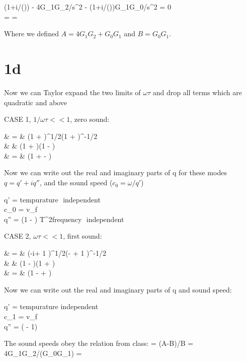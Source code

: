 \documentclass[a4paper,11pt]{article}
\begin{document}
\bea
(1+i/(\omega\tau)) - 4G_1G_2/s^2 - (1+i/(\omega\tau))G_1G_0/s^2 = 0 \\
 = =
\eea
 
Where we defined $A = 4G_1G_2 + G_0G_1$ and $B = G_0G_1$.

\section*{1d}
Now we can Taylor expand the two limits of $\omega\tau$ and drop all terms which are quadratic and above

CASE 1, $1/\omega\tau << 1$, zero sound:

\bea
{} & = &  \bigg(1 + \bigg)^{1/2}\bigg(1 + \bigg)^{-1/2} \\
& \approx  & (1 + )(1 - ) \\
&  = & (1 +  - ) 
\eea

Now we can write out the real and imaginary parts of q for these modes $q = q' + iq''$, and the sound speed ($c_0 = \omega/q'$) 

\bea
q' =  \Rightarrow tempurature\,\, independent \\
c_0 = v_f \\
q'' = \bigg(1 - \bigg) \propto T^2\Rightarrow frequency\,\, independent
\eea

CASE 2, $\omega\tau << 1$, first sound:

\bea
{} & = &  \bigg(-i\omega\tau + 1 \bigg)^{1/2}\bigg(- + 1 \bigg)^{-1/2} \\
& \approx  & (1 - )(1 + ) \\
&  = & (1 -  + ) 
\eea

Now we can write out the real and imaginary parts of q and sound speed:

\bea
q' = \Rightarrow tempurature\,\,independent \\
c_1 = v_f \\
q'' = \bigg( - 1\bigg) \propto {}
\eea

The sound speeds obey the relation from class:
\bea
{} = (A-B)/B = 4G_1G_2/(G_0G_1) = 
\eea
\end{document}

